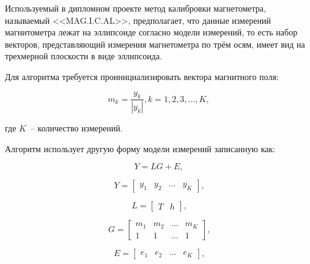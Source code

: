 Используемый в дипломном проекте метод калибровки магнетометра, называемый <<MAG.I.C.AL>>, предполагает, что данные измерений магнитометра
лежат на эллипсоиде согласно модели измерений, то есть набор векторов, представляющий измерения магнетометра по трём осям, 
имеет вид на трехмерной плоскости в виде эллипсоида. %

Для алгоритма требуется проинициализировать вектора магнитного поля:

\begin{equation}
    \label{eq:domain:initMK}
    m_{k} = \frac{y_{k}}{\left|y_{k}\right|}, k=1,2,3,\dots ,K,
  \end{equation}
  \begin{explanationx}
    \item[где] $K$~-- количество измерений.
  \end{explanationx}

Алгоритм использует другую форму модели измерений записанную как:

\begin{equation}
    \label{eq:domain:updatedMagnetModel}
    Y = LG+E,
  \end{equation}

\begin{equation}
    \label{eq:domain:Y}
    Y = \begin{bmatrix}
        y_{1} & y_{2} & \dots & y_{K}
        \end{bmatrix}
        \text{,}
  \end{equation}

\begin{equation}
    \label{eq:domain:L}
    L = \begin{bmatrix}
        T & h
        \end{bmatrix}
        \text{,}
  \end{equation}

\begin{equation}
    \label{eq:domain:G}
    G = \begin{bmatrix}
        m_{1} & m_{2} & \dots & m_{K} \\
        1 & 1 & \dots & 1
        \end{bmatrix}
        \text{,}
  \end{equation}

\begin{equation}
    \label{eq:domain:E}
    E = \begin{bmatrix}
            e_{1} & e_{2} & \dots & e_{K}
        \end{bmatrix}
        \text{,}
  \end{equation}

